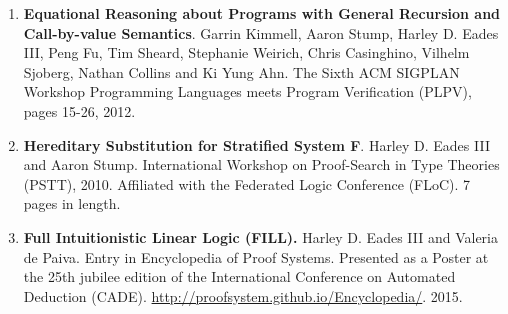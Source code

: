 \documentclass[11pt]{article}
\begin{document}
\begin{enumerate}
  \item[] \textbf{Equational Reasoning about Programs with General
    Recursion and Call-by-value Semantics}.  Garrin Kimmell, Aaron
    Stump, Harley D. Eades III, Peng Fu, Tim Sheard, Stephanie
    Weirich, Chris Casinghino, Vilhelm Sjoberg, Nathan Collins and Ki
    Yung Ahn.  The Sixth ACM SIGPLAN Workshop Programming Languages
    meets Program Verification (PLPV), pages 15-26, 2012.
    
  \item[] \textbf{Hereditary Substitution for Stratified System
    F}. Harley D. Eades III and Aaron Stump.  International Workshop
    on Proof-Search in Type Theories (PSTT), 2010. Affiliated with the
    Federated Logic Conference (FLoC). 7 pages in length.
    
  \item[] \textbf{Full Intuitionistic Linear Logic (FILL).} Harley D. Eades
    III and Valeria de Paiva. Entry in Encyclopedia of Proof
    Systems. Presented as a Poster at the 25th jubilee edition of the
    International Conference on Automated Deduction (CADE). \url{http://proofsystem.github.io/Encyclopedia/}. 2015.
  \end{enumerate}

      
      
      
      
\end{document}
